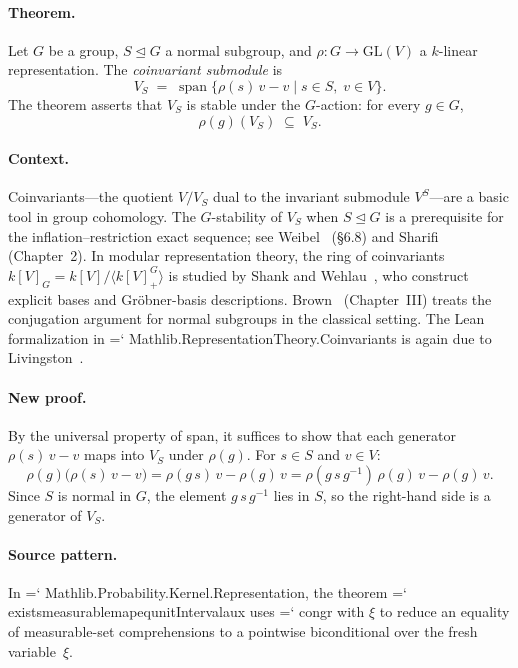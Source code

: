 \documentclass[11pt]{article}
\renewcommand{\texttt}[1]{%
  \begingroup\ttfamily\hyphenchar\font=`\-\relax
  \def\_{\textunderscore\discretionary{}{}{}}%
  #1\endgroup}
\theoremstyle{definition}
\theoremstyle{remark}
\begin{document}
\paragraph{Theorem.}
Let $G$ be a group, $S \trianglelefteq G$ a normal subgroup, and
$\rho : G \to \mathrm{GL}(V)$ a $k$-linear representation.  The
\emph{coinvariant submodule} is
\[
  V_S \;=\; \operatorname{span}\bigl\{\rho(s)\,v - v
    \;\big|\; s \in S,\; v \in V\bigr\}.
\]
The theorem asserts that $V_S$ is stable under the $G$-action: for
every $g \in G$,
\[
  \rho(g)(V_S) \;\subseteq\; V_S.
\]

\paragraph{Context.}
Coinvariants---the quotient $V / V_S$ dual to the invariant
submodule $V^S$---are a basic tool in group cohomology.  The
$G$-stability of $V_S$ when $S \trianglelefteq G$ is a prerequisite
for the inflation--restriction exact sequence; see
Weibel~\cite{weibel_homological_1994} (\S6.8) and
Sharifi~\cite{sharifi_groupcoh} (Chapter~2).  In modular
representation theory, the ring of coinvariants
$k[V]_G = k[V] / \langle k[V]^G_+ \rangle$ is studied by
Shank and Wehlau~\cite{shank_wehlau_2006}, who construct explicit
bases and Gr\"obner-basis descriptions.
Brown~\cite{brown_cohomology_1982} (Chapter~III) treats the
conjugation argument for normal subgroups in the classical setting.
The Lean formalization in \texttt{Mathlib.RepresentationTheory.Coinvariants}
is again due to Livingston~\cite{livingston_group_2023}.

\paragraph{New proof.}
By the universal property of span, it suffices to show that each
generator $\rho(s)\,v - v$ maps into $V_S$ under $\rho(g)$.  For
$s \in S$ and $v \in V$:
\[
  \rho(g)\bigl(\rho(s)\,v - v\bigr)
    = \rho(g\,s)\,v - \rho(g)\,v
    = \rho(g\,s\,g^{-1})\,\rho(g)\,v - \rho(g)\,v.
\]
Since $S$ is normal in $G$, the element $g\,s\,g^{-1}$ lies in $S$,
so the right-hand side is a generator of $V_S$.

\paragraph{Source pattern.}  In \texttt{Mathlib.Probability.Kernel.Representation},
the theorem \texttt{exists\_measurable\_map\_eq\_unitInterval\_aux} uses
\texttt{congr with $\xi$} to reduce an equality of measurable-set
comprehensions to a pointwise biconditional over the fresh variable~$\xi$.
\end{document}
